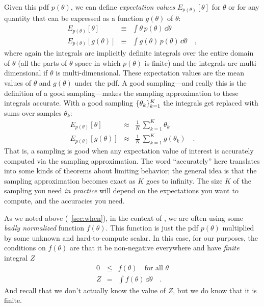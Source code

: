 \documentclass[modern]{aastex61}
\newcommand{\MCMC}{\acronym{MCMC}}
\newcommand{\pars}{\theta}
\begin{document}
Given this pdf $p(\pars)$, we can define \emph{expectation values}
$E_{p(\pars)}[\pars]$
for $\pars$ or for any quantity that can be expressed as a function $g(\pars)$
of $\pars$:
\begin{eqnarray}
E_{p(\pars)}[\pars] &\equiv& \int \pars\,p(\pars)\,\dd \pars
\\
E_{p(\pars)}[g(\pars)] &\equiv& \int g(\pars)\,p(\pars)\,\dd \pars
\quad ,
    \label{eq:the-real-integral}
\end{eqnarray}
where again the integrals are implicitly definite integrals over the
entire domain
of $\pars$ (all the parts of $\pars$ space in which $p(\pars)$ is finite) and the
integrals are multi-dimensional if $\pars$ is multi-dimensional.
These expectation values are the mean values of $\pars$ and $g(\pars)$ under
the pdf.  A good sampling---and really this is the definition of a good
sampling---makes the sampling approximation to these integrals
accurate.
With a good sampling $\setof{\pars_k}_{k=1}^K$ the integrals get replaced
with sums over samples $\pars_k$:
\begin{eqnarray}
E_{p(\pars)}[\pars] &\approx& \frac{1}{K}\,\sum_{k=1}^K \pars_k
\\
E_{p(\pars)}[g(\pars)] &\approx& \frac{1}{K}\,\sum_{k=1}^K g(\pars_k)
\quad .
    \label{eq:the-real-samples}
\end{eqnarray}
That is, a sampling is good when any expectation value of interest is
accurately computed via the sampling approximation.
The word ``accurately'' here translates into some kinds of theorems
about limiting behavior; the general idea is that the sampling
approximation becomes exact as $K$ goes to infinity.
The size $K$ of the sampling you need \emph{in practice} will depend
on the expectations you want to compute, and the accuracies you need.

As we noted above (\sectionname~\ref{sec:when}), in the context of \MCMC, we are often
using some \emph{badly normalized} function $f(\pars)$.
This function is just the pdf $p(\pars)$ multiplied by some unknown and
hard-to-compute scalar.
In this case, for our purposes, the conditions on $f(\pars)$ are that it
be non-negative everywhere and have \emph{finite} integral $Z$
\begin{eqnarray}
0 &\leq& f(\pars) \quad \mbox{for all $\pars$}
\\
Z &=& \int f(\pars)\,\dd \pars \label{eq:proper}
\quad .
\end{eqnarray}
And recall that we don't actually know the value of $Z$, but we do know
that it is finite.
\end{document}
